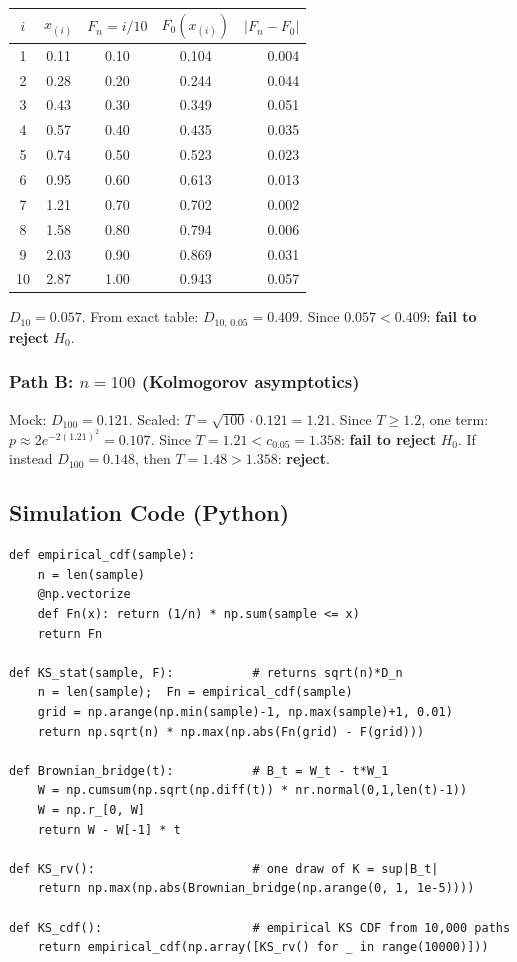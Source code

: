 \documentclass[11pt, a4paper]{article}
\begin{document}
\begin{center}
\begin{tabular}{ccccr}
\toprule
$i$ & $x_{(i)}$ & $F_n=i/10$ & $F_0(x_{(i)})$ & $|F_n-F_0|$ \\
\midrule
1  & 0.11 & 0.10 & 0.104 & 0.004 \\
2  & 0.28 & 0.20 & 0.244 & 0.044 \\
3  & 0.43 & 0.30 & 0.349 & 0.051 \\
4  & 0.57 & 0.40 & 0.435 & 0.035 \\
5  & 0.74 & 0.50 & 0.523 & 0.023 \\
6  & 0.95 & 0.60 & 0.613 & 0.013 \\
7  & 1.21 & 0.70 & 0.702 & 0.002 \\
8  & 1.58 & 0.80 & 0.794 & 0.006 \\
9  & 2.03 & 0.90 & 0.869 & 0.031 \\
10 & 2.87 & 1.00 & 0.943 & 0.057 \\
\bottomrule
\end{tabular}
\end{center}

$D_{10}=0.057$. From exact table: $D_{10,\,0.05}=0.409$.
Since $0.057<0.409$: \textbf{fail to reject} $H_0$.

\subsubsection*{Path B: $n=100$ (Kolmogorov asymptotics)}

Mock: $D_{100}=0.121$. Scaled: $T=\sqrt{100}\cdot 0.121=1.21$.
Since $T\geq 1.2$, one term: $p\approx 2e^{-2(1.21)^2}=0.107$.
Since $T=1.21<c_{0.05}=1.358$: \textbf{fail to reject} $H_0$.
If instead $D_{100}=0.148$, then $T=1.48>1.358$: \textbf{reject}.

\subsection{Simulation Code (Python)}

\begin{verbatim}
def empirical_cdf(sample):
    n = len(sample)
    @np.vectorize
    def Fn(x): return (1/n) * np.sum(sample <= x)
    return Fn

def KS_stat(sample, F):           # returns sqrt(n)*D_n
    n = len(sample);  Fn = empirical_cdf(sample)
    grid = np.arange(np.min(sample)-1, np.max(sample)+1, 0.01)
    return np.sqrt(n) * np.max(np.abs(Fn(grid) - F(grid)))

def Brownian_bridge(t):           # B_t = W_t - t*W_1
    W = np.cumsum(np.sqrt(np.diff(t)) * nr.normal(0,1,len(t)-1))
    W = np.r_[0, W]
    return W - W[-1] * t

def KS_rv():                      # one draw of K = sup|B_t|
    return np.max(np.abs(Brownian_bridge(np.arange(0, 1, 1e-5))))

def KS_cdf():                     # empirical KS CDF from 10,000 paths
    return empirical_cdf(np.array([KS_rv() for _ in range(10000)]))
\end{verbatim}
\end{document}
